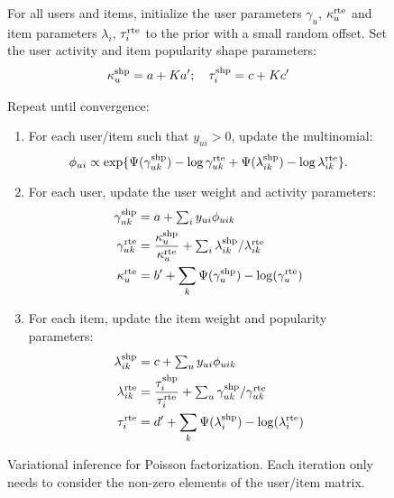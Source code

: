 \begin{figure}[th]
  \begin{framed}
    For all users and items, initialize the user parameters
    $\gamma_u$, $\kappa_u^{\textrm{rte}}$ and item parameters $\lambda_i$,
    $\tau_i^{\textrm{rte}}$ to the prior with a small random offset. Set the
    user activity and item popularity shape parameters:
    \begin{align}
      \kappa_u^{\textrm{shp}} = a + Ka'; \quad \tau_i^{\textrm{shp}} = c + Kc'\nonumber
    \end{align}

    \vspace{0.1in}

    Repeat until convergence:
    \begin{enumerate}
    \item For each user/item such that $y_{ui} > 0$, update the multinomial:
      \begin{equation*}
        \phi_{ui} \propto \exp\{\Psi(\gamma_{uk}^{\textrm{shp}}) - \log
        \gamma_{uk}^{\textrm{rte}} + \Psi(\lambda_{ik}^{\textrm{shp}}) - \log
        \lambda_{ik}^{\textrm{rte}}\}.
      \end{equation*}
    \item For each user, update the user weight and activity parameters:
      \begin{align}
        \gamma_{uk}^{\textrm{shp}} & = a + \textstyle \sum_{i} y_{ui}
        \phi_{uik} \nonumber\\
        \gamma_{uk}^{\textrm{rte}} & = \frac{\kappa_u^{\textrm{shp}}}{\kappa_u^{\textrm{rte}}} + \textstyle \sum_i \lambda_{ik}^{\textrm{shp}} / \lambda_{ik}^{\textrm{rte}}\nonumber\\
        \kappa_{u}^{\textrm{rte}} & = b' + \sum_k \Psi(\gamma_u^{\textrm{shp}}) - \log(\gamma_u^{\textrm{rte}})\nonumber
      \end{align}
    \item For each item, update the item weight and popularity parameters:
      \begin{align}
        \lambda_{ik}^{\textrm{shp}} & = c + \textstyle \sum_{u} y_{ui}
        \phi_{uik}\nonumber\\
        \lambda_{ik}^{\textrm{rte}} & = \frac{\tau_i^{\textrm{shp}}}{\tau_i^{\textrm{rte}}} + \textstyle \sum_u
        \gamma_{uk}^{\textrm{shp}} / \gamma_{uk}^{\textrm{rte}}\nonumber\\
        \tau_{i}^{\textrm{rte}} & = d' + \sum_k \Psi(\lambda_i^{\textrm{shp}}) -
        \log(\lambda_i^{\textrm{rte}})\nonumber
      \end{align}
    \end{enumerate}
\end{framed}
\caption{\label{fig:batch}Variational inference for Poisson
  factorization.  Each iteration only needs to consider the non-zero
  elements of the user/item matrix.}
\end{figure}

